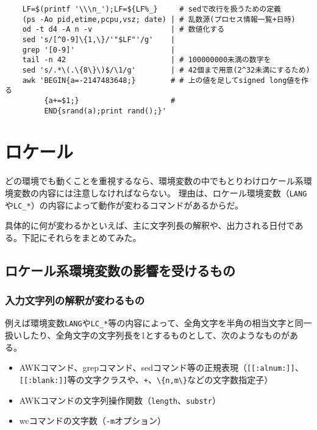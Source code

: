 \noindent
\begin{frameboxit}{160.0mm}
\begin{verbatim}
	LF=$(printf '\\\n_');LF=${LF%_}     # sedで改行を扱うための定義
	(ps -Ao pid,etime,pcpu,vsz; date) | # 乱数源(プロセス情報一覧+日時) 
	od -t d4 -A n -v                  | # 数値化する
	sed 's/[^0-9]\{1,\}/'"$LF"'/g'    |
	grep '[0-9]'                      |
	tail -n 42                        | # 100000000未満の数字を
	sed 's/.*\(.\{8\}\)$/\1/g'        | # 42個まで用意(2^32未満にするため)
	awk 'BEGIN{a=-2147483648;}        # # 上の値を足してsigned long値を作る
	     {a+=$1;}                     #
	     END{srand(a);print rand();}'
\end{verbatim}
\end{frameboxit}


\section{ロケール}
\label{allenvs:locale}

どの環境でも動くことを重視するなら、環境変数の中でもとりわけロケール系環境変数の内容には注意しなければならない。
理由は、ロケール環境変数（\verb|LANG|や\verb|LC_*|）の内容によって動作が変わるコマンドがあるからだ。

具体的に何が変わるかといえば、主に文字列長の解釈や、出力される日付である。下記にそれらをまとめてみた。

\subsection*{ロケール系環境変数の影響を受けるもの}

\subsubsection*{入力文字列の解釈が変わるもの}

例えば環境変数\verb|LANG|や\verb|LC_*|等の内容によって、全角文字を半角の相当文字と同一扱いしたり、全角文字の文字列長を1とするものとして、次のようなものがある。

\begin{itemize}
  \item AWKコマンド、grepコマンド、sedコマンド等の正規表現（\verb|[[:alnum:]]|、\verb|[[:blank:]]|等の文字クラスや、\verb|+|、\verb|\{n,m\}|などの文字数指定子）
  \item AWKコマンドの文字列操作関数（\verb|length|、\verb|substr|）
  \item wcコマンドの文字数（\verb|-m|オプション）
\end{itemize}

